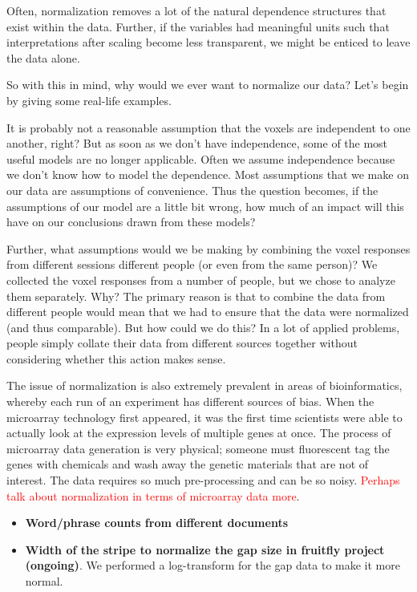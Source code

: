 Often, normalization removes a lot of the natural dependence structures that exist within the data. Further, if the variables had meaningful units such that interpretations after scaling become less transparent, we might be enticed to leave the data alone.




So with this in mind, why would we ever want to normalize our data? Let's begin by giving some real-life examples.


It is probably not a reasonable assumption that the voxels are independent to one another, right? But as soon as we don't have independence, some of the most useful models are no longer applicable. Often we assume independence because we don't know how to model the dependence. Most assumptions that we make on our data are assumptions of convenience. Thus the question becomes, if the assumptions of our model are a little bit wrong, how much of an impact will this have on our conclusions drawn from these models? 


Further, what assumptions would we be making by combining the voxel responses from different sessions different people (or even from the same person)? We collected the voxel responses from a number of people, but we chose to analyze them separately. Why? The primary reason is that to combine the data from different people would mean that we had to ensure that the data were normalized (and thus comparable). But how could we do this? In a lot of applied problems, people simply collate their data from different sources together without considering whether this action makes sense.

The issue of normalization is also extremely prevalent in areas of bioinformatics, whereby each run of an experiment has different sources of bias. When the microarray technology first appeared, it was the first time scientists were able to actually look at the expression levels of multiple genes at once. The process of microarray data generation is very physical; someone must fluorescent tag the genes with chemicals and wash away the genetic materials that are not of interest. The data requires so much pre-processing and can be so noisy. \textcolor{red}{Perhaps talk about normalization in terms of microarray data more}. 

\begin{itemize}
\item {\bf Word/phrase counts from different documents}
\item {\bf Width of the stripe to normalize the gap size in fruitfly project (ongoing)}. We performed a log-transform for the gap data to make it more normal.
\end{itemize}

